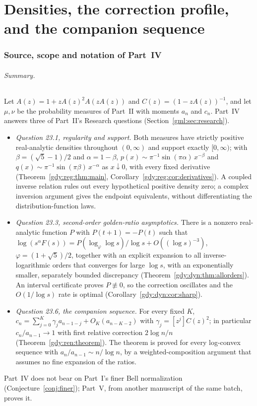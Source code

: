 \documentclass[11pt]{article}
\numberwithin{equation}{section}
\theoremstyle{definition}
\theoremstyle{remark}
\begin{document}
\clearpage
\part{Densities, the correction profile, and the companion sequence}\label{gdy:part}

\section{Source, scope and notation of Part~IV}\label{gdy:sec:source}

\paragraph{Summary.}
Let $A(z)=1+zA(z)^2A(zA(z))$ and $C(z)=(1-zA(z))^{-1}$, and let $\mu,\nu$
be the probability measures of Part~II with moments $a_n$ and $c_n$.
Part~IV answers three of Part~II's Research questions
(Section~\ref{gml:sec:research}).
\begin{itemize}[nosep]
\item \emph{Question 23.1, regularity and support.} Both measures have
strictly positive real-analytic densities throughout $(0,\infty)$ and
support exactly $[0,\infty)$; with $\beta=(\sqrt5-1)/2$ and
$\alpha=1-\beta$,
$p(x)\sim\pi^{-1}\sin(\pi\alpha)\,x^{-\beta}$ and
$q(x)\sim\pi^{-1}\sin(\pi\beta)\,x^{-\alpha}$ as $x\downarrow0$, with
every fixed derivative (Theorem~\ref{gdy:reg:thm:main},
Corollary~\ref{gdy:reg:cor:derivatives}). A coupled inverse relation
rules out every hypothetical positive density zero; a complex inversion
argument gives the endpoint equivalents, without differentiating the
distribution-function laws.
\item \emph{Question 23.3, second-order golden-ratio asymptotics.} There
is a nonzero real-analytic function $P$ with $P(t+1)=-P(t)$ such that
$\log(s^\alpha F(s))=P(\log_\varphi\log s)/\log s+O((\log s)^{-3})$,
$\varphi=(1+\sqrt5)/2$, together with an explicit expansion to all
inverse-logarithmic orders that converges for large $\log s$, with an
exponentially smaller, separately bounded discrepancy
(Theorem~\ref{gdy:dyn:thm:allorders}). An interval certificate proves
$P\not\equiv0$, so the correction oscillates and the $O(1/\log s)$ rate
is optimal (Corollary~\ref{gdy:dyn:cor:sharp}).
\item \emph{Question 23.6, the companion sequence.} For every fixed $K$,
$c_n=\sum_{j=0}^{K}\gamma_ja_{n-1-j}+O_K(a_{n-K-2})$ with
$\gamma_j=[z^j]C(z)^2$; in particular $c_n/a_{n-1}\to1$ with first
relative correction $2\log n/n$ (Theorem~\ref{gdy:ren:theorem}). The
theorem is proved for every log-convex sequence with
$a_n/a_{n-1}\sim n/\log n$, by a weighted-composition argument that
assumes no fine expansion of the ratios.
\end{itemize}
Part~IV does not bear on Part~I's finer Bell normalization
(Conjecture~\ref{conj:finer}); Part~V, from another manuscript of the same
batch, proves it.
\end{document}
